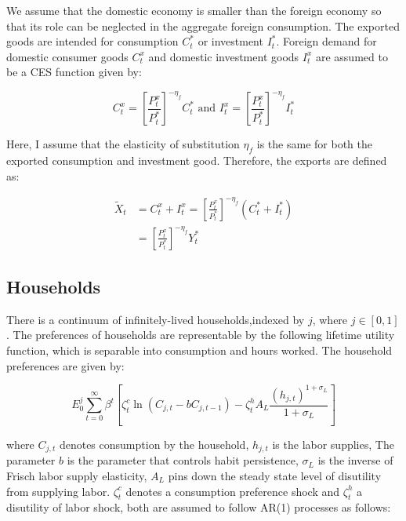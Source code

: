 \documentclass[12pt,oneside,a4paper]{article}
\begin{document}
We assume that the domestic economy is smaller than the foreign economy so that its role can be neglected in the aggregate foreign consumption. The exported goods are intended for consumption $C_{t}^{*}$ or investment $I_{t}^{*}$. Foreign demand for domestic consumer goods $C_{t}^{x}$ and domestic investment goods $I_{t}^{x}$ are assumed to be a CES function given by:

\begin{equation}
C_{t}^{x}=\left[\frac{P_{t}^{x}}{P_{t}^{*}}\right]^{-\eta_{f}} C_{t}^{*} \text { and } I_{t}^{x}=\left[\frac{P_{t}^{x}}{P_{t}^{*}}\right]^{-\eta_{f}} I_{t}^{*}
\end{equation}

Here, I assume that the elasticity of substitution $\eta_{f}$ is the same for both the exported consumption and investment good. Therefore, the exports are defined as:

\begin{equation}
\label{Export_demand}
\begin{aligned}
\tilde{X}_{t} &=C_{t}^{x}+I_{t}^{x}=\left[\frac{P_{t}^{x}}{P_{t}^{*}}\right]^{-\eta_{f}}\left(C_{t}^{*}+I_{t}^{*}\right) \\
&=\left[\frac{P_{t}^{x}}{P_{t}^{*}}\right]^{-\eta_{f}} Y_{t}^{*}
\end{aligned}
\end{equation}
\subsection{Households}
There is a continuum of infinitely-lived households,indexed by $j$, where $j \in [0,1]$. The preferences of households are representable by the following lifetime utility function, which is separable into consumption and hours worked. The household preferences are given by:

\begin{equation}
    E_{0}^{j} \sum_{t=0}^{\infty} \beta^{t}\left[\zeta_{t}^{c} \ln \left(C_{j, t}-b C_{j, t-1}\right)-\zeta_{t}^{h} A_{L} \frac{\left(h_{j, t}\right)^{1+\sigma_{L}}}{1+\sigma_{L}}\right]
\end{equation}

where $C_{j, t}$ denotes consumption by the household, $h_{j, t}$ is the labor supplies, The parameter $b$ is the parameter that controls habit persistence, $\sigma_L$ is the inverse of Frisch labor supply elasticity, $A_L$ pins down the steady state level of disutility from supplying labor. $\zeta_{t}^{c}$ denotes a consumption preference shock and $\zeta_{t}^{h}$ a disutility of labor shock, both are assumed to follow AR(1) processes as follows:
\end{document}
